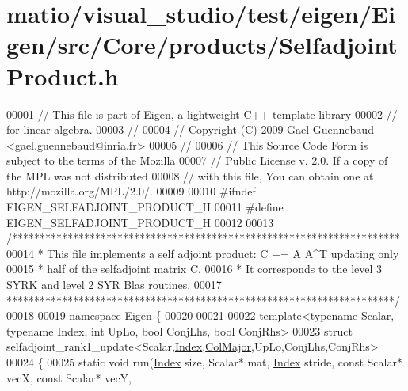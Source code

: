 \hypertarget{matio_2visual__studio_2test_2eigen_2_eigen_2src_2_core_2products_2_selfadjoint_product_8h_source}{}\section{matio/visual\+\_\+studio/test/eigen/\+Eigen/src/\+Core/products/\+Selfadjoint\+Product.h}
\label{matio_2visual__studio_2test_2eigen_2_eigen_2src_2_core_2products_2_selfadjoint_product_8h_source}

\begin{DoxyCode}
00001 \textcolor{comment}{// This file is part of Eigen, a lightweight C++ template library}
00002 \textcolor{comment}{// for linear algebra.}
00003 \textcolor{comment}{//}
00004 \textcolor{comment}{// Copyright (C) 2009 Gael Guennebaud <gael.guennebaud@inria.fr>}
00005 \textcolor{comment}{//}
00006 \textcolor{comment}{// This Source Code Form is subject to the terms of the Mozilla}
00007 \textcolor{comment}{// Public License v. 2.0. If a copy of the MPL was not distributed}
00008 \textcolor{comment}{// with this file, You can obtain one at http://mozilla.org/MPL/2.0/.}
00009 
00010 \textcolor{preprocessor}{#ifndef EIGEN\_SELFADJOINT\_PRODUCT\_H}
00011 \textcolor{preprocessor}{#define EIGEN\_SELFADJOINT\_PRODUCT\_H}
00012 
00013 \textcolor{comment}{/**********************************************************************}
00014 \textcolor{comment}{* This file implements a self adjoint product: C += A A^T updating only}
00015 \textcolor{comment}{* half of the selfadjoint matrix C.}
00016 \textcolor{comment}{* It corresponds to the level 3 SYRK and level 2 SYR Blas routines.}
00017 \textcolor{comment}{**********************************************************************/}
00018 
00019 \textcolor{keyword}{namespace }\hyperlink{namespace_eigen}{Eigen} \{ 
00020 
00021 
00022 \textcolor{keyword}{template}<\textcolor{keyword}{typename} Scalar, \textcolor{keyword}{typename} Index, \textcolor{keywordtype}{int} UpLo, \textcolor{keywordtype}{bool} ConjLhs, \textcolor{keywordtype}{bool} ConjRhs>
00023 \textcolor{keyword}{struct }selfadjoint\_rank1\_update<Scalar,\hyperlink{namespace_eigen_a62e77e0933482dafde8fe197d9a2cfde}{Index},\hyperlink{group__enums_ggaacded1a18ae58b0f554751f6cdf9eb13a0cbd4bdd0abcfc0224c5fcb5e4f6669a}{ColMajor},UpLo,ConjLhs,ConjRhs>
00024 \{
00025   \textcolor{keyword}{static} \textcolor{keywordtype}{void} run(\hyperlink{namespace_eigen_a62e77e0933482dafde8fe197d9a2cfde}{Index} size, Scalar* mat, \hyperlink{namespace_eigen_a62e77e0933482dafde8fe197d9a2cfde}{Index} stride, \textcolor{keyword}{const} Scalar* vecX, \textcolor{keyword}{const} Scalar* vecY, \textcolor{keyword}{
}
\end{DoxyCode}
